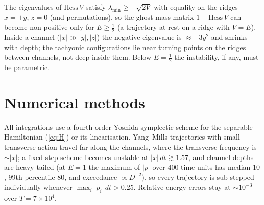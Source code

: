 \documentclass[11pt,a4paper]{article}
\newcommand{\Hess}{\mathrm{Hess}\,}
\begin{document}
The eigenvalues of $\Hess V$ satisfy $\lambda_{\min}\ge-\sqrt{2V}$ with equality on the ridges
$x=\pm y$, $z=0$ (and permutations), so the ghost mass matrix $1+\Hess V$ can become non-positive
only for $E\ge\tfrac12$ (a trajectory at rest on a ridge with $V=E$). Inside a channel
($|x|\gg|y|,|z|$) the negative eigenvalue is $\approx-3y^2$ and shrinks with depth; the
tachyonic configurations lie near turning points on the ridges between channels, not deep inside
them. Below $E=\tfrac12$ the instability, if any, must be parametric.

\section{Numerical methods}
\label{sec:methods}

All integrations use a fourth-order Yoshida symplectic scheme \cite{Yoshida} for the separable
Hamiltonian (\ref{eq:H}) or its linearisation. Yang--Mills trajectories with small transverse
action travel far along the channels, where the transverse frequency is $\sim|x|$; a fixed-step
scheme becomes unstable at $|x|\,dt\gtrsim1.57$, and channel depths are heavy-tailed (at $E=1$
the maximum of $|p|$ over $400$ time units has median $10$, 99th percentile $80$, and exceedance
$\propto D^{-2}$), so every trajectory is sub-stepped individually whenever
$\max_i|p_i|\,dt>0.25$. Relative energy errors stay at $\sim10^{-3}$ over $T=7\times10^4$.
\end{document}
